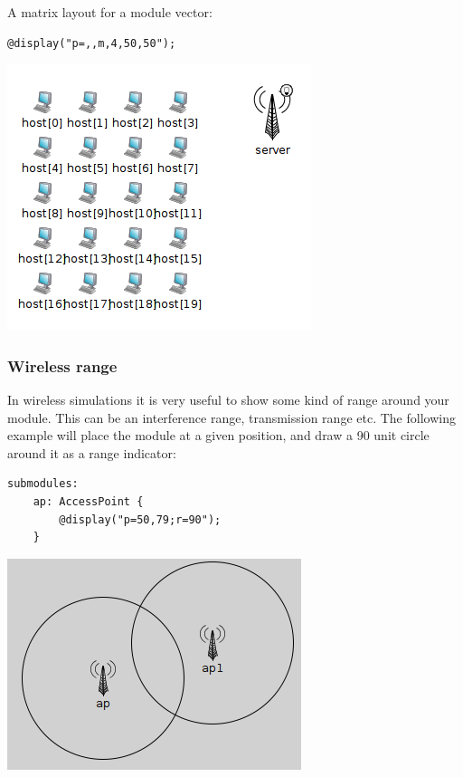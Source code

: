 A matrix layout for a module vector:
\begin{verbatim}
@display("p=,,m,4,50,50");
\end{verbatim}

\begin{center}
\includegraphics{figures/graphics-ptag}
\end{center}

\subsubsection{Wireless range}
In wireless simulations it is very useful to show some kind of range
around your module. This can be an interference range, transmission range 
etc. The following example will place the module at a given position,
and draw a 90 unit circle around it as a range indicator:
\begin{verbatim}
submodules:
    ap: AccessPoint {
        @display("p=50,79;r=90");
    }
\end{verbatim}

\begin{center}
\includegraphics{figures/graphics-rtag}
\end{center}

